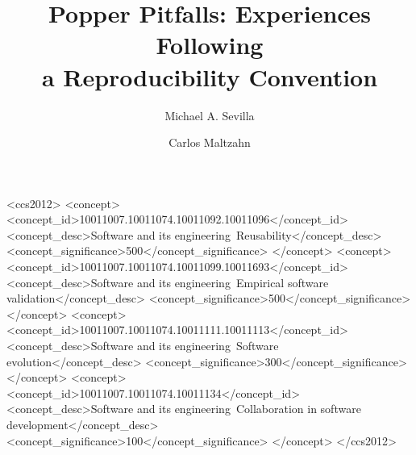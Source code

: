 \documentclass[sigconf]{acmart}
\begin{document}
\title{Popper Pitfalls: Experiences Following \\a Reproducibility Convention}

\author{Michael A. Sevilla}

\author{Carlos Maltzahn}



%
%
\begin{CCSXML}
<ccs2012>
<concept>
<concept_id>10011007.10011074.10011092.10011096</concept_id>
<concept_desc>Software and its engineering~Reusability</concept_desc>
<concept_significance>500</concept_significance>
</concept>
<concept>
<concept_id>10011007.10011074.10011099.10011693</concept_id>
<concept_desc>Software and its engineering~Empirical software validation</concept_desc>
<concept_significance>500</concept_significance>
</concept>
<concept>
<concept_id>10011007.10011074.10011111.10011113</concept_id>
<concept_desc>Software and its engineering~Software evolution</concept_desc>
<concept_significance>300</concept_significance>
</concept>
<concept>
<concept_id>10011007.10011074.10011134</concept_id>
<concept_desc>Software and its engineering~Collaboration in software development</concept_desc>
<concept_significance>100</concept_significance>
</concept>
</ccs2012>
\end{CCSXML}



\maketitle
\end{document}
